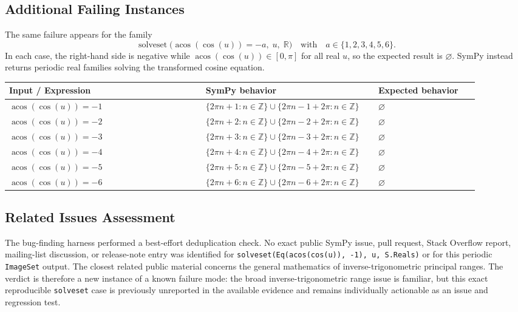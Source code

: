 \documentclass[11pt]{article}
\begin{document}
\subsection{Additional Failing Instances}

The same failure appears for the family
\[
  \operatorname{solveset}\bigl(\operatorname{acos}(\cos(u))=-a,\; u,\; \mathbb{R}\bigr)
  \quad\text{with}\quad a\in\{1,2,3,4,5,6\}.
\]
In each case, the right-hand side is negative while
\(\operatorname{acos}(\cos(u))\in[0,\pi]\) for all real \(u\), so the expected result is
\(\varnothing\).  SymPy instead returns periodic real families solving the
transformed cosine equation.

\begin{center}
\small
\renewcommand{\arraystretch}{1.25}
\begin{tabular}{@{}>{\raggedright\arraybackslash}p{0.39\linewidth}>{\raggedright\arraybackslash}p{0.31\linewidth}>{\raggedright\arraybackslash}p{0.20\linewidth}@{}}
\toprule
\textbf{Input / Expression} & \textbf{SymPy behavior} & \textbf{Expected behavior} \\
\midrule
\(\operatorname{acos}(\cos(u))=-1\) & \(\{2\pi n+1:n\in\mathbb{Z}\}\cup\{2\pi n-1+2\pi:n\in\mathbb{Z}\}\) & \(\varnothing\) \\
\(\operatorname{acos}(\cos(u))=-2\) & \(\{2\pi n+2:n\in\mathbb{Z}\}\cup\{2\pi n-2+2\pi:n\in\mathbb{Z}\}\) & \(\varnothing\) \\
\(\operatorname{acos}(\cos(u))=-3\) & \(\{2\pi n+3:n\in\mathbb{Z}\}\cup\{2\pi n-3+2\pi:n\in\mathbb{Z}\}\) & \(\varnothing\) \\
\(\operatorname{acos}(\cos(u))=-4\) & \(\{2\pi n+4:n\in\mathbb{Z}\}\cup\{2\pi n-4+2\pi:n\in\mathbb{Z}\}\) & \(\varnothing\) \\
\(\operatorname{acos}(\cos(u))=-5\) & \(\{2\pi n+5:n\in\mathbb{Z}\}\cup\{2\pi n-5+2\pi:n\in\mathbb{Z}\}\) & \(\varnothing\) \\
\(\operatorname{acos}(\cos(u))=-6\) & \(\{2\pi n+6:n\in\mathbb{Z}\}\cup\{2\pi n-6+2\pi:n\in\mathbb{Z}\}\) & \(\varnothing\) \\
\bottomrule
\end{tabular}
\end{center}

\subsection{Related Issues Assessment}

The bug-finding harness performed a best-effort deduplication check.  No exact
public SymPy issue, pull request, Stack Overflow report, mailing-list discussion,
or release-note entry was identified for
\texttt{solveset(Eq(acos(cos(u)), -1), u, S.Reals)} or for this periodic
\texttt{ImageSet} output.  The closest related public material concerns the
general mathematics of inverse-trigonometric principal ranges.  The verdict is
therefore a new instance of a known failure mode: the broad inverse-trigonometric
range issue is familiar, but this exact reproducible \texttt{solveset} case is
previously unreported in the available evidence and remains individually
actionable as an issue and regression test.
\end{document}
